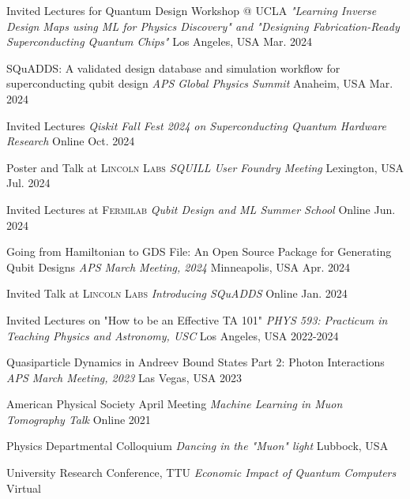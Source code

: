 
\begin{cvhonors}

    \cvhonor
    {Invited Lectures for Quantum Design Workshop @ \textsc{UCLA}} 
    {\textit{\scriptsize "Learning Inverse Design Maps using ML for Physics Discovery" and "Designing Fabrication-Ready Superconducting Quantum Chips"}}
    {Los Angeles, USA}
    {Mar. 2024}

    \cvhonor
    {SQuADDS: A validated design database and simulation workflow for superconducting qubit design}
    {\textit{\scriptsize APS Global Physics Summit}}
    {Anaheim, USA}
    {Mar. 2024}

    \cvhonor
    {Invited Lectures}
    {\textit{\scriptsize Qiskit Fall Fest 2024 on Superconducting Quantum Hardware Research}}
    {Online}
    {Oct. 2024}

    \cvhonor
    {Poster and Talk at \textsc{Lincoln Labs}}
    {\textit{\scriptsize SQUILL User Foundry Meeting}}
    {Lexington, USA}
    {Jul. 2024}

    \cvhonor
    {Invited Lectures at \textsc{Fermilab}}
    {\textit{\scriptsize Qubit Design and ML Summer School}}
    {Online}
    {Jun. 2024}

    \cvhonor
    {Going from Hamiltonian to GDS File: An Open Source Package for Generating Qubit Designs}
    {\textit{\scriptsize APS March Meeting, 2024}}
    {Minneapolis, USA}
    {Apr. 2024}

    \cvhonor
    {Invited Talk at \textsc{Lincoln Labs}}
    {\textit{\scriptsize Introducing SQuADDS}}
    {Online}
    {Jan. 2024}

    \cvhonor
    {Invited Lectures on "How to be an Effective TA 101"}
    {\textit{\scriptsize PHYS 593: Practicum in Teaching Physics and Astronomy, \textsc{USC}}}
    {Los Angeles, USA}
    {2022-2024}

    \cvhonor
    {Quasiparticle Dynamics in Andreev Bound States Part 2: Photon Interactions}
    {\textit{\scriptsize APS March Meeting, 2023}}
    {Las Vegas, USA}
    {2023}

    \cvhonor
    {American Physical Society April Meeting}
    {\textit{\scriptsize Machine Learning in Muon Tomography Talk}}
    {Online}
    {2021}

    \cvhonor
    {Physics Departmental Colloquium}
    {\textit{\scriptsize Dancing in the "Muon" light}}
    {Lubbock, USA}
    {}

    \cvhonor
    {University Research Conference, \textsc{TTU}}
    {\textit{\scriptsize Economic Impact of Quantum Computers}}
    {Virtual}
    {}


\end{cvhonors}
